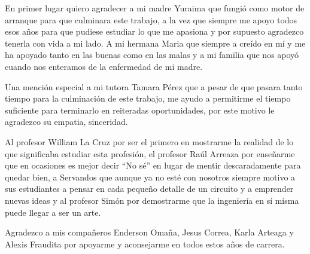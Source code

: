 \hspace{0.5cm}En primer lugar quiero agradecer a mi madre Yuraima que fungió como motor de arranque para que culminara este trabajo, a la vez que siempre me apoyo todos esos años para que pudiese estudiar lo que me apasiona y por supuesto agradezco tenerla con vida a mi lado. A mi hermana Maria que siempre a creído en mí y me ha apoyado tanto en las buenas como en las malas y a mi familia que nos apoyó cuando nos enteramos de la enfermedad de mi madre.

\vspace{2mm}

\hspace{0.5cm}Una mención especial a mi tutora Tamara Pérez que a pesar de que pasara tanto tiempo para la culminación de este trabajo, me ayudo a permitirme el tiempo suficiente para terminarlo en reiteradas oportunidades, por este motivo le agradezco su empatia, sinceridad.

\vspace{2mm}

\hspace{0.5cm}Al profesor William La Cruz por ser el primero en mostrarme la realidad de lo que significaba estudiar esta profesión, el profesor Raúl Arreaza por enseñarme que en ocasiones es mejor decir ``No sé'' en lugar de mentir descaradamente para quedar bien, a Servandos que aunque ya no esté con nosotros siempre motivo a sus estudiantes a pensar en cada pequeño detalle de un circuito y a emprender nuevas ideas y al profesor Simón por demostrarme que la ingeniería en sí misma puede llegar a ser un arte.

\vspace{2mm}

\hspace{0.5cm}Agradezco a mis compañeros Enderson Omaña, Jesus Correa, Karla Arteaga y Alexis Fraudita por apoyarme y aconsejarme en todos estos años de carrera.